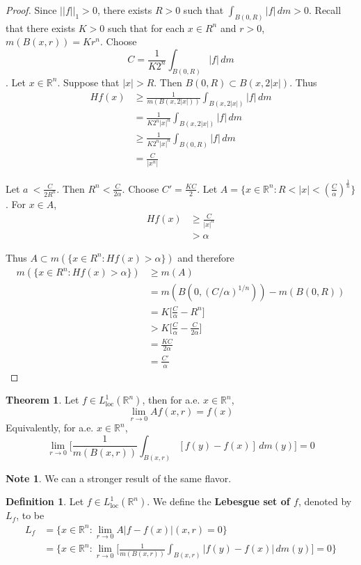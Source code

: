 \documentclass[12pt]{amsart}
\theoremstyle{definition}
\newtheorem{defn}[definition]{Definition}
\newtheorem{note}[definition]{Note}
\newtheorem{thm}[definition]{Theorem}
\newcommand{\al}{\alpha}
\newcommand{\R}{\mathbb{R}}
\newcommand{\dm}{\, d m}
\newcommand{\Ll}{L^1_{\text{loc}}(\R^n)}
\newcommand{\ld}[1]{\label{defn:#1}}
\begin{document}
	\begin{proof}
		Since $||f||_1 >0$, there exists $R>0$ such that $\int_{B(0,R)}|f|\dm >0$. Recall that there exists $K>0$ such that for each $x \in R^n$ and $r>0$, $m(B(x,r)) = Kr^n$. Choose $$C = \frac{1}{K2^n}\int_{B(0,R)}|f| \dm$$. Let $x \in \R^n$. Suppose that $|x|>R$. Then $B(0,R) \subset B(x,2|x|)$. Thus 
		\begin{align*}
			Hf(x) 
			&\geq \frac{1}{m(B(x,2|x|))}\int_{B(x,2|x|)}|f|\dm\\
			&= \frac{1}{K2^n|x|^n}\int_{B(x,2|x|)}|f|\dm \\
			&\geq \frac{1}{K2^n|x|^n}\int_{B(0,R)}|f|\dm \\
			&= \frac{C}{|x^n|}
		\end{align*}
		
		Let $a\ < \frac{C}{2R^n}$. Then $R^n < \frac{C}{2 \al}$. Choose $C' =\frac{KC}{2}$. Let $A = \{x \in \R^n: R < |x|< (\frac{C}{\al})^{\frac{1}{n}}\}$. For $x \in A$, 
		\begin{align*}
			Hf(x) 
			&\geq \frac{C}{|x|^n} \\
			& > \al
		\end{align*}
		
		Thus $A \subset m(\{x \in R^n: Hf(x)> \al\})$ and therefore 
		\begin{align*}
			m(\{x \in R^n: Hf(x)> \al\}) 
			&\geq m(A) \\
			&= m(B(0,(C/\al)^{1/n})) - m(B(0,R)) \\
			&= K\bigg [\frac{C}{\al} - R^n \bigg] \\
			&> K\bigg[\frac{C}{\al} - \frac{C}{2 \al}\bigg] \\
			&= \frac{KC}{2 \al}\\
			&= \frac{C'}{\al}
		\end{align*}
	\end{proof}
	
	\begin{thm}
		Let $f \in \Ll$, then for a.e. $x \in \R^n$, $$\lim_{r \rightarrow 0} Af(x,r) =f(x)$$ 
		Equivalently, for a.e. $x \in \R^n$, $$ \lim_{r \rightarrow 0} \bigg[ \frac{1}{m(B(x,r))}\int_{B(x,r)}[f(y)-f(x)]\dm(y)\bigg] =0$$
	\end{thm}
	
	\begin{note}
		We can a stronger result of the same flavor.
	\end{note}
	
	\begin{defn} \ld{00000} 
		Let $f \in \Ll$. We define the \textbf{Lebesgue set of $f$}, denoted by $L_f$, to be 
		\begin{align*}
			L_f 
			&= \{x \in \R^n: \lim_{r \rightarrow 0} A|f-f(x)|(x,r) =0 \}\\
			&= \bigg \{x \in \R^n: \lim_{r \rightarrow 0} \bigg[ \frac{1}{m(B(x,r))}\int_{B(x,r)}|f(y) - f(x)|\dm(y)\bigg] =0 \bigg \}
		\end{align*}
	\end{defn}
	
\end{document}
